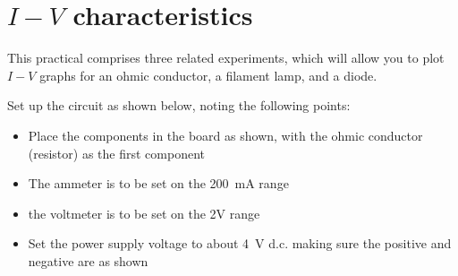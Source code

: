 \section{$I-V$ characteristics}
\label{refraction}

This practical comprises three related experiments, which will allow you to plot $I-V$ graphs for an ohmic conductor, a filament lamp, and a diode.

Set up the circuit as shown below, noting the following points:
\begin{itemize}
\item Place the components in the board as shown, with the ohmic conductor (resistor) as the first component
\item The ammeter is to be set on the \SI{200}{mA} range
\item the voltmeter is to be set on the 2V range
\item Set the power supply voltage to about \SI{4}{V} d.c. making sure the positive and negative are as shown
\end{itemize}

\begin{center}
\end{center}

